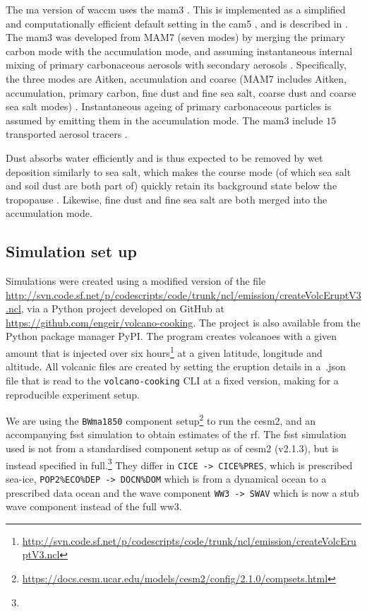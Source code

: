 \documentclass{ametsocV6.1}
\begin{document}
The \gls{ma} version of \gls{waccm} uses the \gls{mam3} \citep{gettleman2019}. This is
implemented as a simplified and computationally efficient default setting in the
\gls{cam5} \citep{liu2016}, and is described in \citet{liu2012}. The \gls{mam3} was
developed from MAM7 (seven modes) by merging the primary carbon mode with the
accumulation mode, and assuming instantaneous internal mixing of primary carbonaceous
aerosols with secondary aerosols \citep{liu2016}. Specifically, the three modes are
Aitken, accumulation and coarse (MAM7 includes Aitken, accumulation, primary carbon,
fine dust and fine sea salt, coarse dust and coarse sea salt modes) \citep{liu2016}.
Instantaneous ageing of primary carbonaceous particles is assumed by emitting them in
the accumulation mode. The \gls{mam3} include \(15\) transported aerosol tracers
\citep{liu2016}.

Dust absorbs water efficiently and is thus expected to be removed by wet deposition
similarly to sea salt, which makes the course mode (of which sea salt and soil dust are
both part of) quickly retain its background state below the tropopause \citep{liu2012}.
Likewise, fine dust and fine sea salt are both merged into the accumulation mode.

\subsection{Simulation set up}

Simulations were created using a modified version of the file
\url{http://svn.code.sf.net/p/codescripts/code/trunk/ncl/emission/createVolcEruptV3.ncl},
via a Python project developed on GitHub at
\url{https://github.com/engeir/volcano-cooking}. The project is also available from the
Python package manager PyPI\@. The program creates volcanoes with a given 
amount that is injected over six
hours\footnote{\url{http://svn.code.sf.net/p/codescripts/code/trunk/ncl/emission/createVolcEruptV3.ncl}}
at a given latitude, longitude and altitude. All volcanic  files are created by
setting the eruption details in a~.json file that is read to the
\texttt{volcano-cooking} CLI at a fixed version, making for a reproducible experiment
setup.

We are using the \texttt{BWma1850} component
setup\footnote{\url{https://docs.cesm.ucar.edu/models/cesm2/config/2.1.0/compsets.html}}
to run the \gls{cesm2}, and an accompanying \gls{fsst}
simulation to obtain estimates of the \gls{rf}. The \gls{fsst} simulation used is not
from a standardised component setup as of \gls{cesm2} (v2.1.3), but is instead specified
in full.\footnote{\fssturl} They differ in \texttt{CICE -> CICE\%PRES}, which is
prescribed sea-ice, \texttt{POP2\%ECO\%DEP -> DOCN\%DOM} which is from a dynamical ocean
to a prescribed data ocean and the wave component \texttt{WW3 -> SWAV} which is now a
stub wave component instead of the full \gls{ww3}.
\end{document}
